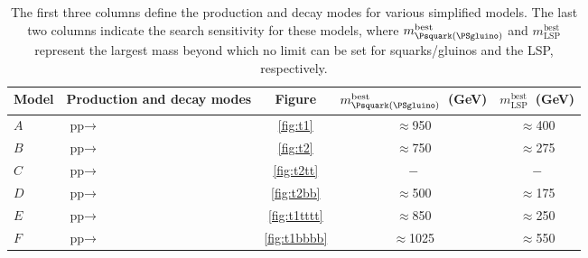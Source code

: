 \begin{table}
  \caption{The first three columns define the production and decay
    modes for various simplified models. The last two columns
    indicate the search sensitivity for these models, where
    $m_{\Psquark(\PSgluino)}^{\textrm{best}}$ and
    $m_{\textrm{LSP}}^{\textrm{best}}$ represent the largest mass
    beyond which no limit can be set for squarks/gluinos and the LSP,
    respectively.
  }  
  \label{tab:sms_summary}
  \centering
  \begin{tabular}{ llccc }
    \hline
    Model & Production and decay modes & Figure & 
    $m_{\Psquark(\PSgluino)}^{\textrm{best}}$~(GeV) & $m_{
    \textrm{LSP}}^{\textrm{best}}$~(GeV) \\ [0.5ex]
    \hline
    $A$ & $\textrm{pp}\rightarrow$ \HepProcess{\PSgluino\PSgluino\to\Pquark\APquark\PSneutralino\Pquark\APquark\PSneutralino}
    & \ref{fig:t1}  & $\approx$950 & $\approx$400 \\
    $B$ & $\textrm{pp}\rightarrow$\HepProcess{\Psquark\Psquark\to\Pquark\PSneutralino\APquark\PSneutralino}
    & \ref{fig:t2}  & $\approx$750 & $\approx$275 \\
    $C$ & $\textrm{pp}\rightarrow$\HepProcess{\PStop\PStop\to\Ptop\PSneutralino\APtop\PSneutralino} & \ref{fig:t2tt}%
    & $-$ & $-$ \\ %
    $D$ &$\textrm{pp}\rightarrow$\HepProcess{\PSbottom\PSbottom\to\Pbottom\PSneutralino\APbottom\PSneutralino}
    & \ref{fig:t2bb} & $\approx$500 & $\approx$175 \\
    $E$ & $\textrm{pp}\rightarrow$\HepProcess{\PSgluino\PSgluino\to\Ptop\APtop\PSneutralino\Ptop\APtop\PSneutralino} & \ref{fig:t1tttt}  & $\approx$850 & $\approx$250 \\
    $F$ &
    $\textrm{pp}\rightarrow$\HepProcess{\PSgluino\PSgluino\to\Pbottom\APbottom\PSneutralino\Pbottom\APbottom\PSneutralino}
    & \ref{fig:t1bbbb} & $\approx$1025 & $\approx$550 \\
    \hline
  \end{tabular}
\end{table}




